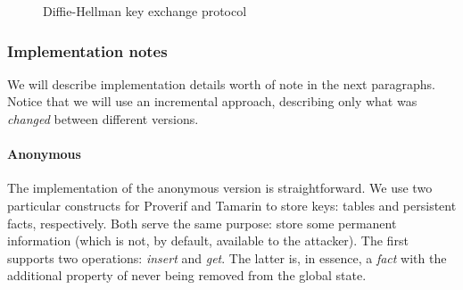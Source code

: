 \begin{figure}[t]
    \setmscoptions
    \begin{msc}{}



        \nextlevel[5]
        \nextlevel


        \nextlevel[6]
        \nextlevel

        \nextlevel

    \end{msc}
    \centering
    \caption{Diffie-Hellman key exchange protocol}
    \label{fig:dh-key-exchange}
\end{figure}

\subsubsection{Implementation notes}

We will describe implementation details worth of note in the next paragraphs. Notice that we will use an incremental approach, describing only what was \textit{changed} between different versions.

\paragraph{Anonymous} The implementation of the anonymous version is straightforward. We use two particular constructs for Proverif and Tamarin to store keys: tables and persistent facts, respectively. Both serve the same purpose: store some permanent information (which is not, by default, available to the attacker). The first supports two operations: \textit{insert} and \textit{get}. The latter is, in essence, a \textit{fact} with the additional property of never being removed from the global state.

